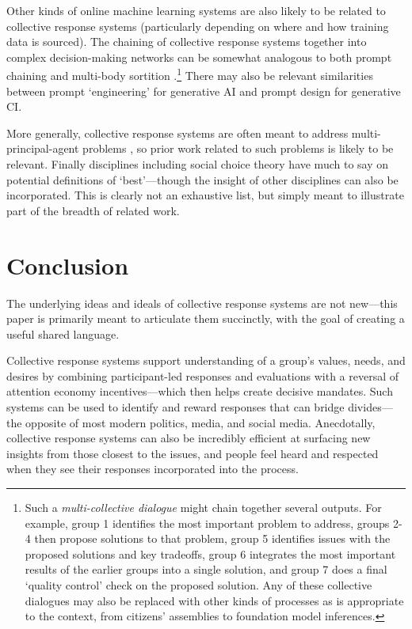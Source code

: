 \documentclass[sigconf,authorversion,nonacm,linkcolor=blue,colorlinks]{acmart}
\begin{document}
Other kinds of online machine learning systems are also likely to be related to collective response systems (particularly depending on where and how training data is sourced). The chaining of collective response systems together into complex decision-making networks can be somewhat analogous to both prompt chaining \cite{wu2022PromptChainerChainingLarge} and multi-body sortition \cite{bouriciusWhyHybridBicameralism2018}.\footnote{Such a \emph{multi-collective dialogue} might chain together several outputs. For example, group 1 identifies the most important problem to address, groups 2-4 then propose solutions to that problem, group 5 identifies issues with the proposed solutions and key tradeoffs, group 6 integrates the most important results of the earlier groups into a single solution, and group 7 does a final `quality control' check on the proposed solution. Any of these collective dialogues may also be replaced with other kinds of processes as is appropriate to the context, from citizens' assemblies to foundation model inferences.} There may also be relevant similarities between prompt `engineering' for generative AI and prompt design for generative CI.

More generally, collective response systems are often meant to address multi-principal-agent problems \cite{konya2022elicitation}, so prior work related to such problems is likely to be relevant. Finally disciplines including social choice theory have much to say on potential definitions of `best'---though the insight of other disciplines can also be incorporated. This is clearly not an exhaustive list, but simply meant to illustrate part of the breadth of related work.

\hypertarget{conclusion}{%
\section{Conclusion}\label{conclusion}}

The underlying ideas and ideals of collective response systems are not new---this paper is primarily meant to articulate them succinctly, with the goal of creating a useful shared language. 


Collective response systems support understanding of a group's values, needs, and desires by combining participant-led responses and evaluations with a reversal of attention economy incentives---which then helps create decisive mandates. Such systems can be used to identify and reward responses that can bridge divides---the opposite of most modern politics, media, and social media. Anecdotally, collective response systems can also be incredibly efficient at surfacing new insights from those closest to the issues, and people feel heard and respected when they see their responses incorporated into the process.
\end{document}
